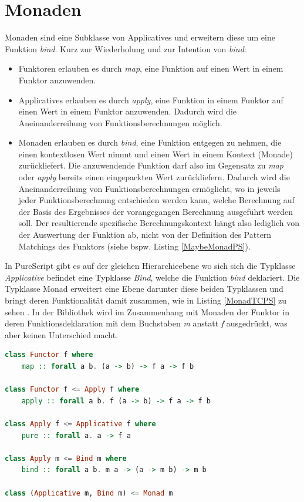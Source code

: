 \documentclass[
12pt,
ngerman,
oneside]
{scrbook} %
\begin{document}
\section{Monaden}
Monaden sind eine Subklasse von Applicatives und erweitern diese um eine Funktion \emph{bind}. Kurz zur Wiederholung und zur Intention von \emph{bind}:
\begin{itemize}
	\item Funktoren erlauben es durch \emph{map}, eine Funktion auf einen Wert in einem Funktor anzuwenden.
	\item Applicatives erlauben es durch \emph{apply}, eine Funktion in einem Funktor auf einen Wert in einem Funktor anzuwenden. Dadurch wird die Aneinanderreihung von Funktionsberechnungen möglich.
	\item Monaden erlauben es durch \emph{bind}, eine Funktion entgegen zu nehmen, die einen kontextlosen Wert nimmt und einen Wert in einem Kontext (Monade) zurückliefert. Die anzuwendende Funktion darf also im Gegensatz zu \emph{map} oder \emph{apply} bereits einen eingepackten Wert zurückliefern. Dadurch wird die Aneinanderreihung von Funktionsberechnungen ermöglicht, wo in jeweils jeder Funktionsberechnung entschieden werden kann, welche Berechnung auf der Basis des Ergebnisses der vorangegangen Berechnung ausgeführt werden soll. Der resultierende spezifische Berechnungskontext hängt also lediglich von der Auswertung der Funktion ab, nicht von der Definition des Pattern Matchings des Funktors (siehe bspw. Listing \ref{MaybeMonadPS}).
\end{itemize}

In PureScript gibt es auf der gleichen Hierarchieebene wo sich sich die Typklasse \emph{Applicative} befindet eine Typklasse \emph{Bind}, welche die Funktion \emph{bind} deklariert. Die Typklasse Monad erweitert eine Ebene darunter diese beiden Typklassen und bringt deren Funktionalität damit zusammen, wie in Listing \ref{MonadTCPS} zu sehen \cite[][S. 101]{Freeman17}. In der Bibliothek wird im Zusammenhang mit Monaden der Funktor in deren Funktionsdeklaration mit dem Buchstaben \emph{m} anstatt \emph{f} ausgedrückt, was aber keinen Unterschied macht.

\begin{lstlisting}[language=purescript, style=numbered-and-boxed, caption=Typklasse Monad, label=MonadTCPS]
class Functor f where
	map :: forall a b. (a -> b) -> f a -> f b

class Functor f <= Apply f where
	apply :: forall a b. f (a -> b) -> f a -> f b

class Apply f <= Applicative f where
	pure :: forall a. a -> f a

class Apply m <= Bind m where
	bind :: forall a b. m a -> (a -> m b) -> m b

class (Applicative m, Bind m) <= Monad m
\end{lstlisting}
\end{document}
